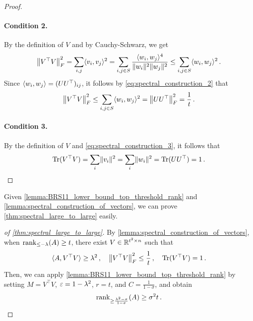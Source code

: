 \begin{proof}
    \paragraph{Condition 2.}
    By the definition of $V$ and by Cauchy-Schwarz, we get
    \begin{equation*}
        \left\lVert V^{\top} V\right\rVert_F^2
        = \sum_{i, j} \langle v_i, v_j\rangle^2
        = \sum_{i, j \in S} \frac{\langle w_i, w_j\rangle^4}{\lVert w_i\rVert^2 \lVert w_j\rVert^2}
        \leq \sum_{i, j \in S} \langle w_i, w_j\rangle^2 \,.
    \end{equation*}
    Since $\langle w_i, w_j\rangle = (U U^{\top})_{i j}$, it follows by \cref{eq:spectral_construction_2} that
    \begin{equation*}
        \left\lVert V^{\top} V\right\rVert_F^2
        \leq \sum_{i, j \in S} \langle w_i, w_j\rangle^2
        = \left\lVert U U^{\top}\right\rVert_F^2
        = \frac{1}{t}\,.
    \end{equation*}

    \paragraph{Condition 3.}
    By the definition of $V$ and \cref{eq:spectral_construction_3}, it follows that
    \begin{equation*}
        \mathrm{Tr}(V^{\top} V)
        = \sum_{i} \lVert v_i\rVert^2
        = \sum_{i} \lVert w_i\rVert^2
        = \mathrm{Tr} (U U^{\top})
        = 1 \,.
    \end{equation*}
\end{proof}

Given \cref{lemma:BRS11_lower_bound_top_threshold_rank} and \cref{lemma:spectral_construction_of_vectors}, we can prove \cref{thm:spectral_large_to_large} easily.
\begin{proof}[of \cref{thm:spectral_large_to_large}]
    By \cref{lemma:spectral_construction_of_vectors}, when $\operatorname{rank}_{\leq -\lambda} (A) \geq t$, there exist $V \in {\mathbb R}^{t^2 \times n}$ such that
    \begin{equation*}
        \langle A, V^{\top} V\rangle \geq \lambda^2 \,, \quad
        \left\lVert V^{\top} V\right\rVert_F^2 \leq \frac{1}{t} \,, \quad
        \mathrm{Tr}(V^{\top} V) = 1 \,.
    \end{equation*}
    Then, we can apply \cref{lemma:BRS11_lower_bound_top_threshold_rank} by setting $M=V^{\top} V$, $\varepsilon = 1-\lambda^2$, $r=t$, and $C=\frac{1}{1-\sigma}$, and obtain
    \begin{equation*}
        \operatorname{rank}_{\geq \frac{\lambda^2-\sigma}{1-\sigma}} (A) \geq \sigma^2 t \,.
    \end{equation*}
\end{proof}